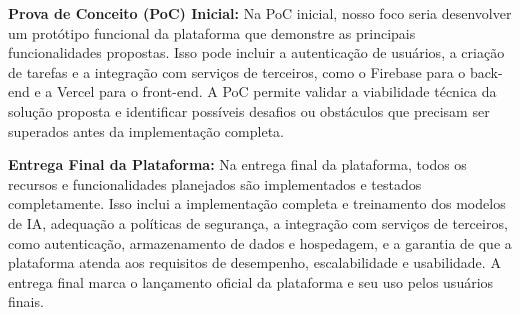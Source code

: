 \textbf{Prova de Conceito (PoC) Inicial:}
Na PoC inicial, nosso foco seria desenvolver um protótipo funcional da plataforma que demonstre as principais funcionalidades propostas. Isso pode incluir a autenticação de usuários, a criação de tarefas e a integração com serviços de terceiros, como o Firebase para o back-end e a Vercel para o front-end. A PoC permite validar a viabilidade técnica da solução proposta e identificar possíveis desafios ou obstáculos que precisam ser superados antes da implementação completa.

\textbf{Entrega Final da Plataforma:}
Na entrega final da plataforma, todos os recursos e funcionalidades planejados são implementados e testados completamente. Isso inclui a implementação completa e treinamento dos modelos de IA, adequação a políticas de segurança, a integração com serviços de terceiros, como autenticação, armazenamento de dados e hospedagem, e a garantia de que a plataforma atenda aos requisitos de desempenho, escalabilidade e usabilidade. A entrega final marca o lançamento oficial da plataforma e seu uso pelos usuários finais.